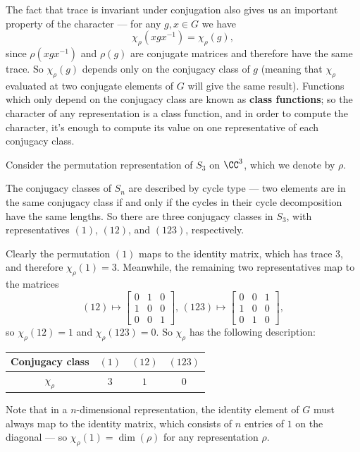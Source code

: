 The fact that trace is invariant under conjugation also gives us an important property of the character --- for any $g, x \in G$ we have \[\chi_\rho(xgx^{-1}) = \chi_\rho(g),\] since $\rho(xgx^{-1})$ and $\rho(g)$ are conjugate matrices and therefore have the same trace. So $\chi_\rho(g)$ depends only on the conjugacy class of $g$ (meaning that $\chi_\rho$ evaluated at two conjugate elements of $G$ will give the same result). Functions which only depend on the conjugacy class are known as \textbf{class functions}; so the character of any representation is a class function, and in order to compute the character, it's enough to compute its value on one representative of each conjugacy class. 
 
\begin{example}
Consider the permutation representation of $S_3$ on $\CC^3$, which we denote by $\rho$. 

The conjugacy classes of $S_n$ are described by cycle type --- two elements are in the same conjugacy class if and only if the cycles in their cycle decomposition have the same lengths. So there are three conjugacy classes in $S_3$, with representatives $(1)$, $(12)$, and $(123)$, respectively. 

Clearly the permutation $(1)$ maps to the identity matrix, which has trace $3$, and therefore $\chi_\rho(1) = 3$. Meanwhile, the remaining two representatives map to the matrices 
\[
     (12) \mapsto \begin{bmatrix} 0 & 1 & 0 \\ 1 & 0 & 0 \\ 0 & 0 & 1 \end{bmatrix}, \, (123) \mapsto \begin{bmatrix} 0 & 0 & 1 \\ 1 & 0 & 0 \\ 0 & 1 & 0 \end{bmatrix},
 \]
 so $\chi_\rho(12) = 1$ and $\chi_\rho(123) = 0$. So $\chi_\rho$ has the following description:
 
 \begin{center}
     \begin{tabular}{c|c|c|c}
        Conjugacy class & $(1)$ & $(12)$ & $(123)$ \\
         \hline 
        $\chi_\rho$ & $3$ & $1$ & $0$
     \end{tabular}
 \end{center}
 \end{example}
 
Note that in a $n$-dimensional representation, the identity element of $G$ must always map to the identity matrix, which consists of $n$ entries of $1$ on the diagonal --- so $\chi_\rho(1) = \dim(\rho)$ for any representation $\rho$.

